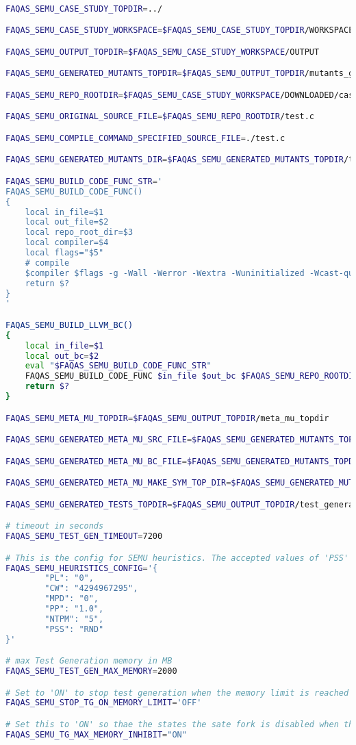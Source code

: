 \begin{lstlisting}[language=bash,label=listing:ASN:conf,caption=faqas\_semus\_conf.sh file for ASN case study.]

FAQAS_SEMU_CASE_STUDY_TOPDIR=../

FAQAS_SEMU_CASE_STUDY_WORKSPACE=$FAQAS_SEMU_CASE_STUDY_TOPDIR/WORKSPACE

FAQAS_SEMU_OUTPUT_TOPDIR=$FAQAS_SEMU_CASE_STUDY_WORKSPACE/OUTPUT

FAQAS_SEMU_GENERATED_MUTANTS_TOPDIR=$FAQAS_SEMU_OUTPUT_TOPDIR/mutants_generation

FAQAS_SEMU_REPO_ROOTDIR=$FAQAS_SEMU_CASE_STUDY_WORKSPACE/DOWNLOADED/casestudy

FAQAS_SEMU_ORIGINAL_SOURCE_FILE=$FAQAS_SEMU_REPO_ROOTDIR/test.c

FAQAS_SEMU_COMPILE_COMMAND_SPECIFIED_SOURCE_FILE=./test.c

FAQAS_SEMU_GENERATED_MUTANTS_DIR=$FAQAS_SEMU_GENERATED_MUTANTS_TOPDIR/test

FAQAS_SEMU_BUILD_CODE_FUNC_STR='
FAQAS_SEMU_BUILD_CODE_FUNC()
{
    local in_file=$1
    local out_file=$2
    local repo_root_dir=$3
    local compiler=$4
    local flags="$5"
    # compile
    $compiler $flags -g -Wall -Werror -Wextra -Wuninitialized -Wcast-qual -Wshadow -Wundef -fdiagnostics-show-option -D_DEBUG -I $repo_root_dir -O0 $in_file -o $out_file $flags
    return $?
}
'

FAQAS_SEMU_BUILD_LLVM_BC()
{
    local in_file=$1
    local out_bc=$2
    eval "$FAQAS_SEMU_BUILD_CODE_FUNC_STR"
    FAQAS_SEMU_BUILD_CODE_FUNC $in_file $out_bc $FAQAS_SEMU_REPO_ROOTDIR clang '-c -emit-llvm'
    return $?
}

FAQAS_SEMU_META_MU_TOPDIR=$FAQAS_SEMU_OUTPUT_TOPDIR/meta_mu_topdir

FAQAS_SEMU_GENERATED_META_MU_SRC_FILE=$FAQAS_SEMU_GENERATED_MUTANTS_TOPDIR/test.MetaMu.c

FAQAS_SEMU_GENERATED_META_MU_BC_FILE=$FAQAS_SEMU_GENERATED_MUTANTS_TOPDIR/test.MetaMu.bc

FAQAS_SEMU_GENERATED_META_MU_MAKE_SYM_TOP_DIR=$FAQAS_SEMU_GENERATED_MUTANTS_TOPDIR/"MakeSym-TestGen-Input"

FAQAS_SEMU_GENERATED_TESTS_TOPDIR=$FAQAS_SEMU_OUTPUT_TOPDIR/test_generation

# timeout in seconds
FAQAS_SEMU_TEST_GEN_TIMEOUT=7200

# This is the config for SEMU heuristics. The accepted values of 'PSS' are 'RND' for random and 'MDO' for minimum distance to output
FAQAS_SEMU_HEURISTICS_CONFIG='{
        "PL": "0",
        "CW": "4294967295",
        "MPD": "0",
        "PP": "1.0",
        "NTPM": "5",
        "PSS": "RND"
}'

# max Test Generation memory in MB
FAQAS_SEMU_TEST_GEN_MAX_MEMORY=2000

# Set to 'ON' to stop test generation when the memory limit is reached
FAQAS_SEMU_STOP_TG_ON_MEMORY_LIMIT='OFF'

# Set this to 'ON' so thae the states the sate fork is disabled when the memory limit is reached, to avoid going much over it
FAQAS_SEMU_TG_MAX_MEMORY_INHIBIT="ON"
\end{lstlisting}

